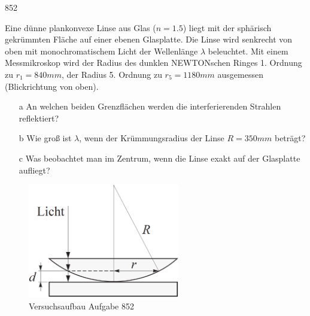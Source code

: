 \begin{auf}
    852
\end{auf}
Eine dünne plankonvexe Linse aus Glas ($n=1.5$) liegt mit der sphärisch gekrümmten Fläche auf einer ebenen Glasplatte. Die Linse wird senkrecht von oben mit monochromatischem Licht der Wellenlänge $\lambda$ beleuchtet. Mit einem Messmikroskop wird der Radius des dunklen NEWTONschen Ringes 1. Ordnung zu $r_1=840mm$, der Radius 5. Ordnung zu $r_5=1180mm$ ausgemessen (Blickrichtung von oben).
\begin{enumerate}
    \item[a] An welchen	beiden Grenzflächen werden die interferierenden Strahlen reflektiert?
    \item[b] Wie groß ist $\lambda$, wenn der Krümmungsradius der Linse	$R=350mm$ beträgt?
    \item[c] Was beobachtet man im Zentrum, wenn die Linse exakt auf der Glasplatte aufliegt?
\end{enumerate}
\begin{figure}[h]
    \centering
    \includegraphics[height=5cm]{images/852_0.png}
    \caption{Versuchsaufbau Aufgabe 852}
\end{figure}